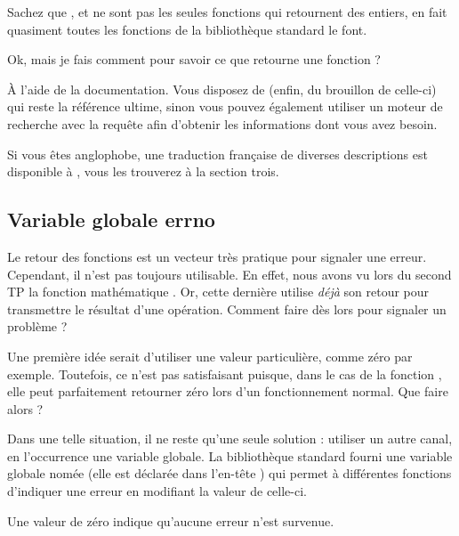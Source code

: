 Sachez que ,  et  ne
sont pas les seules fonctions qui retournent des entiers, en fait
quasiment toutes les fonctions de la bibliothèque standard le font.

\begin{questionbox}
 Ok, mais je fais comment pour savoir ce que retourne une fonction ?
\end{questionbox}


À l'aide de la documentation. Vous disposez de
 (enfin, du
brouillon de celle-ci) qui reste la référence ultime, sinon vous pouvez
également utiliser un moteur de recherche avec la requête
 afin d'obtenir les informations dont
vous avez besoin.

\begin{infobox}
 Si vous êtes anglophobe, une traduction française de diverses descriptions
 est disponible à , vous
 les trouverez à la section trois.
\end{infobox}


\subsection{Variable globale errno}
\label{variable-globale-errno}

Le retour des fonctions est un vecteur très pratique pour signaler une
erreur. Cependant, il n'est pas toujours utilisable. En effet, nous
avons vu lors du second TP la fonction mathématique . Or,
cette dernière utilise \emph{déjà} son retour pour transmettre le
résultat d'une opération. Comment faire dès lors pour signaler un
problème ?

Une première idée serait d'utiliser une valeur particulière, comme zéro
par exemple. Toutefois, ce n'est pas satisfaisant puisque, dans le cas
de la fonction , elle peut parfaitement retourner zéro
lors d'un fonctionnement normal. Que faire alors ?

Dans une telle situation, il ne reste qu'une seule solution : utiliser
un autre canal, en l'occurrence une variable globale. La bibliothèque
standard fourni une variable globale nomée  (elle est
déclarée dans l'en-tête ) qui
permet à différentes fonctions d'indiquer une erreur en modifiant la
valeur de celle-ci.

\begin{infobox}
Une valeur de zéro indique qu'aucune
erreur n'est survenue.
\end{infobox}
 

